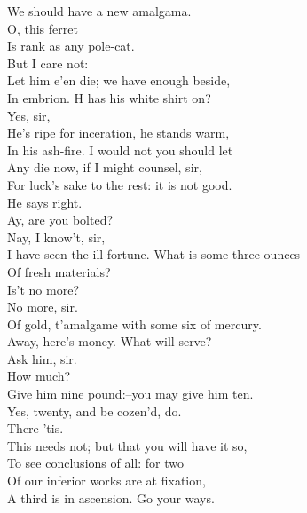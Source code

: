 \documentclass{memoir}
\begin{document}
\begin{drama*}
 We should have a new amalgama.\\
\surlyspeaks {} O, this ferret\\
 Is rank as any pole-cat.\\
\subtlespeaks {} But I care not:\\
 Let him e'en die; we have enough beside,\\
 In embrion. H has his white shirt on?\\
\facespeaks  Yes, sir,\\
 He's ripe for inceration, he stands warm,\\
 In his ash-fire. I would not you should let\\
 Any die now, if I might counsel, sir,\\
 For luck's sake to the rest: it is not good.\\
\mammonspeaks  He says right.\\
\surlyspeaks {} Ay, are you bolted?\\
\facespeaks {} Nay, I know't, sir,\\
 I have seen the ill fortune. What is some three ounces\\
 Of fresh materials?\\
\mammonspeaks {} Is't no more?\\
\facespeaks {} No more, sir.\\
 Of gold, t'amalgame with some six of mercury.\\
\mammonspeaks  Away, here's money. What will serve?\\
\facespeaks {} Ask him, sir.\\
\mammonspeaks  How much?\\
\subtlespeaks {} Give him nine pound:--you may give him ten.\\
\surlyspeaks  Yes, twenty, and be cozen'd, do.\\
\mammonspeaks {} There 'tis.\\
\subtlespeaks  This needs not; but that you will have it so,\\
 To see conclusions of all: for two\\
 Of our inferior works are at fixation,\\
 A third is in ascension. Go your ways.\\

\end{drama*}
\end{document}
